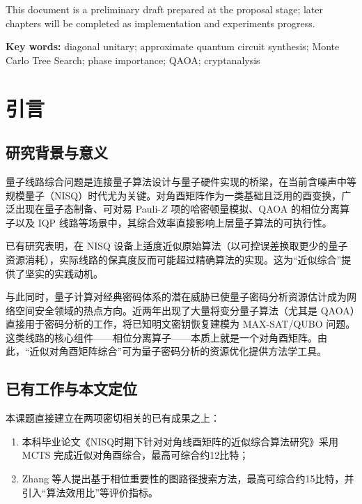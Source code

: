 \documentclass{HDU-Bachelor-Thesis}
\begin{document}
This document is a preliminary draft prepared at the proposal stage; later chapters will be completed as implementation and experiments progress.

\vspace{\baselineskip}\noindent
\textbf{Key words:} diagonal unitary; approximate quantum circuit synthesis; Monte Carlo Tree Search; phase importance; QAOA; cryptanalysis

\clearpage
\tableofcontents

\clearpage
{}
\pagestyle{HDU-bachelor}

\section{引言}

\subsection{研究背景与意义}

量子线路综合问题是连接量子算法设计与量子硬件实现的桥梁，在当前含噪声中等规模量子（NISQ）时代尤为关键。对角酉矩阵作为一类基础且泛用的酉变换，广泛出现在量子态制备、可对易 Pauli-$Z$ 项的哈密顿量模拟、QAOA 的相位分离算子以及 IQP 线路等场景中，其综合效率直接影响上层量子算法的可执行性。

已有研究表明，在 NISQ 设备上适度近似原始算法（以可控误差换取更少的量子资源消耗），实际线路的保真度反而可能超过精确算法的实现。这为“近似综合”提供了坚实的实践动机。

与此同时，量子计算对经典密码体系的潜在威胁已使量子密码分析资源估计成为网络空间安全领域的热点方向。近两年出现了大量将变分量子算法（尤其是 QAOA）直接用于密码分析的工作，将已知明文密钥恢复建模为 MAX-SAT/QUBO 问题。这类线路的核心组件——相位分离算子——本质上就是一个对角酉矩阵。由此，“近似对角酉矩阵综合”可为量子密码分析的资源优化提供方法学工具。

\subsection{已有工作与本文定位}

本课题直接建立在两项密切相关的已有成果之上：

\begin{enumerate}
  \item 本科毕业论文《NISQ时期下针对对角线酉矩阵的近似综合算法研究》采用 MCTS 完成近似对角酉综合，最高可综合约12比特\cite{nisq-mcts-thesis}；
  \item Zhang 等人提出基于相位重要性的图路径搜索方法，最高可综合约15比特，并引入“算法效用比”等评价指标\cite{zhang2024approximate}。
\end{enumerate}
\end{document}
